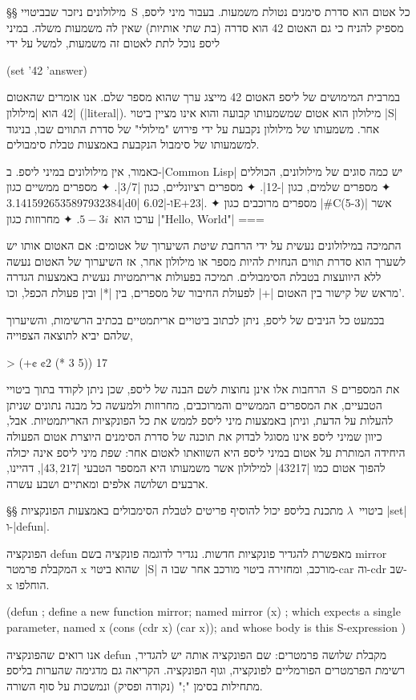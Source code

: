 §§ מילולונים
ניזכר שבביטויי~S כל אטום הוא סדרת סימנים נטולת משמעות. בעבור מיני ליספ,
מספיק להניח כי גם האטום 42 הוא סדרה (בת שתי אותיות) שאין לה משמעות משלה.
במיני ליספ נוכל לתת לאטום זה משמעות, למשל על ידי
\begin{LISP}
(set '42 'answer)
\end{LISP}
במרבית המימושים של ליספ האטום 42 מייצג ערך שהוא מספר
שלם. אנו אומרים שהאטום 42 הוא \ע|מילולון| (\E|literal|). מילולון הוא
אטום שמשמעותו קבועה והוא אינו מציין ביטוי \E|S| אחר. משמעותו של מילולון
נקבעת על ידי פירוש "מילולי" של סדרת התווים שבו, בניגוד למשמעותו של סימבול
הנקבעת באמצעות טבלת סימבולים.

כאמור, אין מילולונים במיני ליספ. ב-\E|Common Lisp| יש כמה סוגים של מילולונים,
הכוללים
✦ מספרים שלמים, כגון \T|-12|.
✦ מספרים רציונליים, כגון \T|3/7|.
✦ מספרים ממשיים כגון \T|3.1415926535897932384d0| ו-\T|6.02E+23|.
✦ מספרים מרוכבים כגון \T|#C(5-3)| אשר ערכו הוא~$5-3i$.
✦ מחרוזות כגון \T|"Hello, World"|
===

התמיכה במילולונים נעשית על ידי הרחבת שיטת השיערוך של אטומים: אם האטום אותו יש
לשערך הוא סדרת תווים הנחזית להיות מספר או מילולון אחר, אז השיערוך של האטום נעשה
ללא היוועצות בטבלת הסימבולים. תמיכה בפעולות אריתמטיות נעשית באמצעות הגדרה מראש
של קישור בין האטום \T|+| לפעולת החיבור של מספרים, בין \T|*| ובין פעולת הכפל,
וכו'.

בכמעט כל הניבים של ליספ, ניתן לכתוב ביטויים אריתמטיים בכתיב הרשימות, והשיערוך
שלהם יביא לתוצאה הצפוייה,

\begin{LISP}
> (+¢ ¢2 (* 3 5))
17
\end{LISP}

הרחבות אלו אינן נחוצות לשם הבנה של ליספ, שכן ניתן לקודד בתוך ביטויי~S את
המספרים הטבעיים, את המספרים הממשיים והמרוכבים, מחרוזות ולמעשה כל מבנה נתונים
שניתן להעלות על הדעת, וניתן באמצעות מיני ליספ לממש את כל הפונקציות האריתמטיות.
אבל, כיוון שמיני ליספ אינו מסוגל לבדוק את תוכנה של סדרת הסימנים היוצרת אטום
הפעולה היחידה המותרת על אטום במיני ליספ היא השוואתו לאטום אחר: שפת מיני ליספ
אינה יכולה להפוך אטום כמו \T|43217| למילולון אשר משמעותו היא המספר הטבעי
\E|$43,217$|, דהיינו, ארבעים ושלושה אלפים ומאתיים ושבע עשרה.

§§ ביטויי~$λ$
מתכנת בליספ יכול להוסיף פריטים לטבלת הסימבולים באמצעות הפונקציות \E|set|
ו-\E|defun|.

הפונקציה defun מאפשרת להגדיר פונקציות חדשות. נגדיר לדוגמה פונקציה בשם mirror
המקבלת פרמטר x שהוא ביטוי~\E|S| מורכב, ומחזירה ביטוי מורכב אחר שבו ה-car וה-cdr
שב-x הוחלפו.
\begin{LISP}
(defun ; define a new function
  mirror; named mirror
  (x) ; which expects a single parameter, named x
  (cons (cdr x) (car x)); and whose body is this S-expression
)
\end{LISP}
אנו רואים שהפונקציה defun מקבלת שלושה פרמטרים: שם הפונקציה אותה יש להגדיר,
רשימת הפרמטרים הפורמליים לפונקציה, וגוף הפונקציה. הקריאה גם מדגימה שהערות בליספ
מתחילות בסימן ";" (נקודה ופסיק) ונמשכות על סוף השורה.

